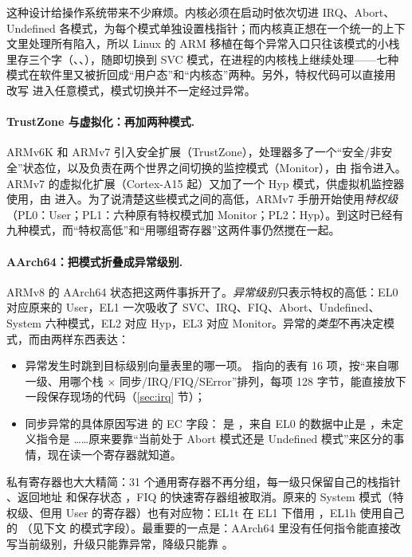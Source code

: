 这种设计给操作系统带来不少麻烦。内核必须在启动时依次切进 IRQ、Abort、Undefined 各模式，为每个模式单独设置栈指针；而内核真正想在一个统一的上下文里处理所有陷入，所以 Linux 的 ARM 移植在每个异常入口只往该模式的小栈里存三个字（、、），随即切换到 SVC 模式，在进程的内核栈上继续处理——七种模式在软件里又被折回成“用户态”和“内核态”两种。另外，特权代码可以直接用  改写  进入任意模式，模式切换并不一定经过异常。

\paragraph{TrustZone 与虚拟化：再加两种模式.} ARMv6K 和 ARMv7 引入安全扩展（TrustZone），处理器多了一个“安全/非安全”状态位，以及负责在两个世界之间切换的监控模式（Monitor），由  指令进入。ARMv7 的虚拟化扩展（Cortex-A15 起）又加了一个 Hyp 模式，供虚拟机监控器使用，由  进入。为了说清楚这些模式之间的高低，ARMv7 手册开始使用\emph{特权级}（PL0：User；PL1：六种原有特权模式加 Monitor；PL2：Hyp）。到这时已经有九种模式，而“特权高低”和“用哪组寄存器”这两件事仍然搅在一起。

\paragraph{AArch64：把模式折叠成异常级别.} ARMv8 的 AArch64 状态把这两件事拆开了。\emph{异常级别}只表示特权的高低：EL0 对应原来的 User，EL1 一次吸收了 SVC、IRQ、FIQ、Abort、Undefined、System 六种模式，EL2 对应 Hyp，EL3 对应 Monitor。异常的\emph{类型}不再决定模式，而由两样东西表达：

\begin{itemize}
  \item 异常发生时跳到目标级别向量表里的哪一项。 指向的表有 16 项，按“来自哪一级、用哪个栈 $\times$ 同步/IRQ/FIQ/SError”排列，每项 128 字节，能直接放下一段保存现场的代码（\ref{sec:irq} 节）；
  \item 同步异常的具体原因写进  的 EC 字段： 是 ，来自 EL0 的数据中止是 ，未定义指令是 ……原来要靠“当前处于 Abort 模式还是 Undefined 模式”来区分的事情，现在读一个寄存器就知道。
\end{itemize}

私有寄存器也大大精简：31 个通用寄存器不再分组，每一级只保留自己的栈指针 、返回地址  和保存状态 ，FIQ 的快速寄存器组被取消。原来的 System 模式（特权级、但用 User 的寄存器）也有对应物：EL1t 在 EL1 下借用 ，EL1h 使用自己的 （见下文  的模式字段）。最重要的一点是：AArch64 里没有任何指令能直接改写当前级别，升级只能靠异常，降级只能靠 。

